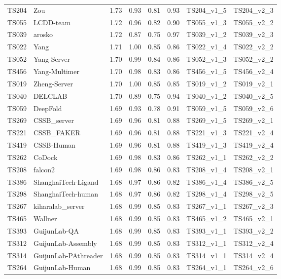 \begin{longtable}{llllllll}
TS204 & Zou & 1.73 & 0.93 & 0.81 & 0.93 & TS204\_v1\_5 & TS204\_v2\_3 \\ 
TS055 & LCDD-team & 1.72 & 0.96 & 0.82 & 0.90 & TS055\_v1\_3 & TS055\_v2\_2 \\ 
TS039 & arosko & 1.72 & 0.87 & 0.75 & 0.97 & TS039\_v1\_2 & TS039\_v2\_3 \\ 
TS022 & Yang & 1.71 & 1.00 & 0.85 & 0.86 & TS022\_v1\_4 & TS022\_v2\_2 \\ 
TS052 & Yang-Server & 1.70 & 0.99 & 0.84 & 0.86 & TS052\_v1\_3 & TS052\_v2\_2 \\ 
TS456 & Yang-Multimer & 1.70 & 0.98 & 0.83 & 0.86 & TS456\_v1\_5 & TS456\_v2\_4 \\ 
TS019 & Zheng-Server & 1.70 & 1.00 & 0.85 & 0.85 & TS019\_v1\_2 & TS019\_v2\_1 \\ 
TS040 & DELCLAB & 1.70 & 0.89 & 0.75 & 0.94 & TS040\_v1\_2 & TS040\_v2\_5 \\ 
TS059 & DeepFold & 1.69 & 0.93 & 0.78 & 0.91 & TS059\_v1\_5 & TS059\_v2\_6 \\ 
TS269 & CSSB\_server & 1.69 & 0.96 & 0.81 & 0.88 & TS269\_v1\_5 & TS269\_v2\_1 \\ 
TS221 & CSSB\_FAKER & 1.69 & 0.96 & 0.81 & 0.88 & TS221\_v1\_3 & TS221\_v2\_4 \\ 
TS419 & CSSB-Human & 1.69 & 0.96 & 0.81 & 0.88 & TS419\_v1\_3 & TS419\_v2\_4 \\ 
TS262 & CoDock & 1.69 & 0.98 & 0.83 & 0.86 & TS262\_v1\_1 & TS262\_v2\_2 \\ 
TS208 & falcon2 & 1.69 & 0.98 & 0.86 & 0.83 & TS208\_v1\_4 & TS208\_v2\_1 \\ 
TS386 & ShanghaiTech-Ligand & 1.68 & 0.97 & 0.86 & 0.82 & TS386\_v1\_4 & TS386\_v2\_5 \\ 
TS298 & ShanghaiTech-human & 1.68 & 0.97 & 0.86 & 0.82 & TS298\_v1\_4 & TS298\_v2\_5 \\ 
TS267 & kiharalab\_server & 1.68 & 0.99 & 0.85 & 0.83 & TS267\_v1\_1 & TS267\_v2\_3 \\ 
TS465 & Wallner & 1.68 & 0.99 & 0.85 & 0.83 & TS465\_v1\_2 & TS465\_v2\_1 \\ 
TS393 & GuijunLab-QA & 1.68 & 0.99 & 0.85 & 0.83 & TS393\_v1\_1 & TS393\_v2\_2 \\ 
TS312 & GuijunLab-Assembly & 1.68 & 0.99 & 0.85 & 0.83 & TS312\_v1\_1 & TS312\_v2\_4 \\ 
TS314 & GuijunLab-PAthreader & 1.68 & 0.99 & 0.85 & 0.83 & TS314\_v1\_1 & TS314\_v2\_4 \\ 
TS264 & GuijunLab-Human & 1.68 & 0.99 & 0.85 & 0.83 & TS264\_v1\_1 & TS264\_v2\_6 \\ 

\end{longtable}
